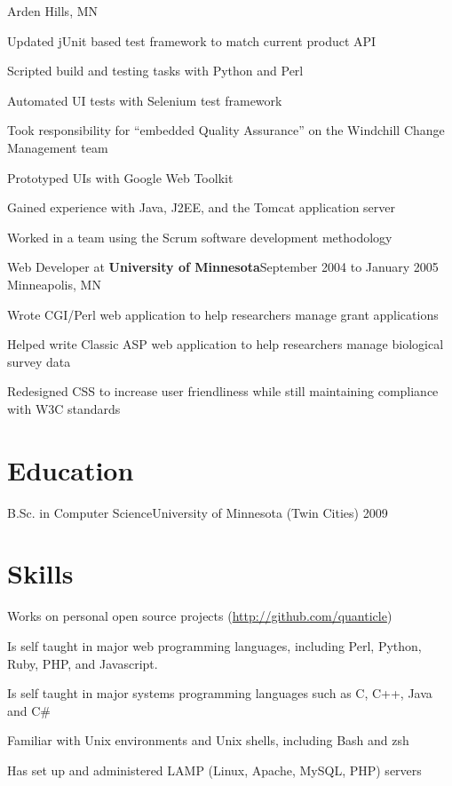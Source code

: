\documentclass[letterpaper]{article}
\newenvironment{resume-list}
{\begin{itemize}
 \setlength{\itemsep}{0pt}
 \setlength{\parskip}{0pt}}
{\end{itemize}}
\begin{document}
Arden Hills, MN
\begin{resume-list}
\item Updated jUnit based test framework to match current product API
\item Scripted build and testing tasks with Python and Perl
\item Automated UI tests with Selenium test framework
\item Took responsibility for ``embedded Quality Assurance'' on the Windchill Change Management team
\item Prototyped UIs with Google Web Toolkit
\item Gained experience with Java, J2EE, and the Tomcat application server
\item Worked in a team using the Scrum software development methodology
\end{resume-list}
\noindent Web Developer at {\bfseries University of Minnesota}\dotfill September 2004 to January 2005\\
Minneapolis, MN
\begin{resume-list}
\item Wrote CGI/Perl web application to help researchers manage grant applications
\item Helped write Classic ASP web application to help researchers manage biological survey data
\item Redesigned CSS to increase user friendliness while still maintaining compliance with W3C standards
\end{resume-list}
\section*{Education}
\noindent B.Sc. in Computer Science\dotfill University of Minnesota (Twin Cities) 2009\\
\section*{Skills}
\begin{resume-list}
\item Works on personal open source projects (\url{http://github.com/quanticle})
\item Is self taught in major web programming languages, including Perl, Python, Ruby, PHP, and Javascript.
\item Is self taught in major systems programming languages such as C, C++, Java and C\#
\item Familiar with Unix environments and Unix shells, including Bash and zsh
\item Has set up and administered LAMP (Linux, Apache, MySQL, PHP) servers
\end{resume-list}
\end{document}
